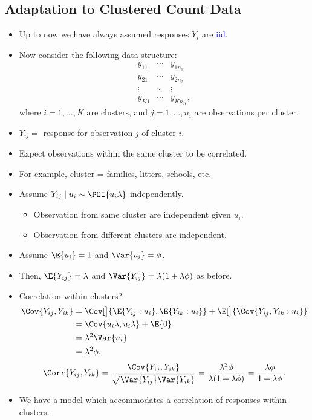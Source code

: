 \documentclass[oneside]{book}\usepackage[]{graphicx}\usepackage[svgnames]{xcolor}
\providecommand\given{} %
\renewcommand\given{\nonscript\:\delimsize\vert\nonscript\:\mathopen{}}%
\renewcommand\given{\nonscript\:\delimsize\vert\nonscript\:\mathopen{}}%
\renewcommand\given{\nonscript\:\delimsize\vert\nonscript\:\mathopen{}}%
\renewcommand\given{\nonscript\:\delimsize\vert\nonscript\:\mathopen{}}%
\renewcommand\given{\nonscript\:\delimsize\vert\nonscript\:\mathopen{}}%
\renewcommand\given{\nonscript\:\delimsize\vert\nonscript\:\mathopen{}}%
\renewcommand\given{\nonscript\:\delimsize\vert\nonscript\:\mathopen{}}%
\renewcommand\given{\nonscript\:\delimsize\vert\nonscript\:\mathopen{}}%
\renewcommand\given{\nonscript\:\delimsize\vert\nonscript\:\mathopen{}}%
\renewcommand\given{\nonscript\:\delimsize\vert\nonscript\:\mathopen{}}%
\renewcommand\given{\nonscript\:\delimsize\vert\nonscript\:\mathopen{}}%
\renewcommand\given{\nonscript\:\delimsize\vert\nonscript\:\mathopen{}}%
\renewcommand\given{:}
\begin{document}
\subsection*{Adaptation to Clustered Count Data}
\begin{itemize}
      \item Up to now we have always assumed responses $ Y_i $ are \textcolor{Blue}{iid}.
      \item Now consider the following data structure:
            \[ \begin{matrix}
                        y_{11} & \cdots & y_{1n_1}   \\
                        y_{21} & \cdots & y_{2n_2}   \\
                        \vdots & \ddots & \vdots     \\
                        y_{K1} & \cdots & y_{K n_K},
                  \end{matrix} \]
            where $ i=1,\ldots,K $ are clusters, and $ j=1,\ldots,n_i $ are observations per cluster.
      \item $ Y_{ij}= $ response for observation $ j $ of cluster $ i $.
      \item Expect observations within the same cluster to be correlated.
      \item For example, cluster = families, litters, schools, etc.
      \item Assume $ Y_{ij}\mid u_i \sim \POI{u_i\lambda} $ independently.
            \begin{itemize}
                  \item Observation from same cluster are independent given $ u_i $.
                  \item Observation from different clusters are independent.
            \end{itemize}
      \item Assume $ \E{u_i}=1 $ and $ \Var{u_i}=\phi $.
      \item Then, $ \E{Y_{ij}}=\lambda $ and $ \Var{Y_{ij}}=\lambda(1+\lambda\phi) $ as before.
      \item Correlation within clusters?
            \begin{align*}
                  \Cov{Y_{ij},Y_{ik}}
                   & =\Cov[\big]{ \E{Y_{ij}\given u_i},\E{Y_{ik}\given u_i} } + \E[\big]{\Cov{Y_{ij},Y_{ik}\given u_i}} \\
                   & =\Cov{u_i\lambda,u_i\lambda}+\E{0}                                                                 \\
                   & =\lambda^2\Var{u_i}                                                                                \\
                   & =\lambda^2\phi.
            \end{align*}
            \[ \Corr{Y_{ij},Y_{ik}}=\frac{\Cov{Y_{ij},Y_{ik}}}{\sqrt{\Var{Y_{ij}}\Var{Y_{ik}} }}=\frac{\lambda^2\phi}{\lambda(1+\lambda\phi)}=\frac{\lambda\phi}{1+\lambda\phi}. \]
      \item We have a model which accommodates a correlation of responses within clusters.
\end{itemize}
\end{document}
